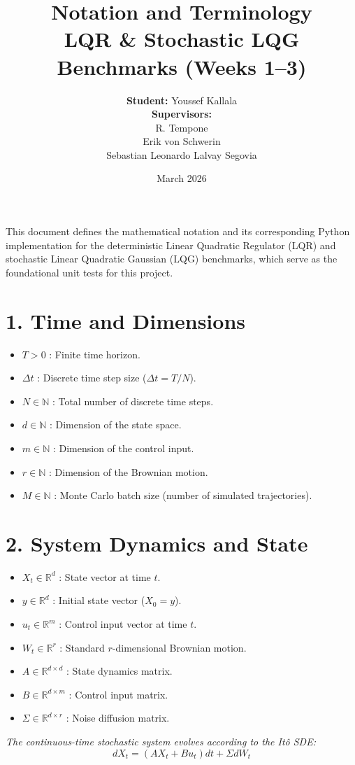 \documentclass[12pt, a4paper]{article}
\title{\textbf{Notation and Terminology} \\
\large LQR \& Stochastic LQG Benchmarks (Weeks 1--3)}
\author{
    \textbf{Student:} Youssef Kallala \\[0.5cm]
    \textbf{Supervisors:} \\
    R. Tempone \\
    Erik von Schwerin \\
    Sebastian Leonardo Lalvay Segovia
}
\date{March 2026}
\begin{document}
\maketitle

\noindent This document defines the mathematical notation and its corresponding Python implementation for the deterministic Linear Quadratic Regulator (LQR) and stochastic Linear Quadratic Gaussian (LQG) benchmarks, which serve as the foundational unit tests for this project.

\section*{1. Time and Dimensions}
\begin{itemize}
    \item $T > 0$ : Finite time horizon.
    \item $\Delta t$ : Discrete time step size ($\Delta t = T/N$).
    \item $N \in \mathbb{N}$ : Total number of discrete time steps.
    \item $d \in \mathbb{N}$ : Dimension of the state space.
    \item $m \in \mathbb{N}$ : Dimension of the control input.
    \item $r \in \mathbb{N}$ : Dimension of the Brownian motion.
    \item $M \in \mathbb{N}$ : Monte Carlo batch size (number of simulated trajectories).
\end{itemize}

\section*{2. System Dynamics and State}
\begin{itemize}
    \item $X_t \in \mathbb{R}^d$ : State vector at time $t$.
    \item $y \in \mathbb{R}^d$ : Initial state vector ($X_0 = y$).
    \item $u_t \in \mathbb{R}^m$ : Control input vector at time $t$.
    \item $W_t \in \mathbb{R}^r$ : Standard $r$-dimensional Brownian motion.
    \item $A \in \mathbb{R}^{d \times d}$ : State dynamics matrix.
    \item $B \in \mathbb{R}^{d \times m}$ : Control input matrix.
    \item $\Sigma \in \mathbb{R}^{d \times r}$ : Noise diffusion matrix.
\end{itemize}
\textit{The continuous-time stochastic system evolves according to the It\^o SDE: } 
$$ dX_t = (A X_t + B u_t) dt + \Sigma dW_t $$
\end{document}
